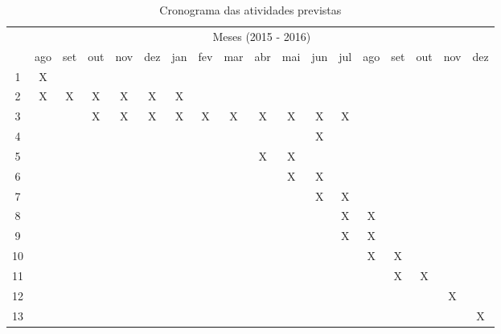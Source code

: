\begin{table}[!htpb]
  \centering
  \begin{small}
    \setlength{\tabcolsep}{4pt}
    \begin{tabular}{|c|c|c|c|c|c|c|c|c|c|c|c|c|c|c|c|c|c|}\hline
     & \multicolumn{17}{c|}{Meses (2015 - 2016)}\\ \cline{2-18}
    \raisebox{1.5ex}{Etapa} & ago & set & out & nov & dez & jan & fev & mar & abr & mai & jun & jul & ago & set & out & nov & dez \\ \hline
    1 & X &   &   &   &   &   &   &   &   &   &   &   &   &   &   &   & \\ \hline
    2 & X & X & X & X & X & X &   &   &   &   &   &   &   &   &   &   & \\ \hline
    3 &   &   & X & X & X & X & X & X & X & X & X & X &   &   &   &   & \\ \hline
    4 &   &   &   &   &   &   &   &   &   &   & X &   &   &   &   &   & \\ \hline
    5 &   &   &   &   &   &   &   &   & X & X &   &   &   &   &   &   & \\ \hline
    6 &   &   &   &   &   &   &   &   &   & X & X &   &   &   &   &   & \\ \hline
    7 &   &   &   &   &   &   &   &   &   &   & X & X &   &   &   &   & \\ \hline
    8 &   &   &   &   &   &   &   &   &   &   &   & X & X &   &   &   & \\ \hline
    9 &   &   &   &   &   &   &   &   &   &   &   & X & X &   &   &   & \\ \hline
    10 &   &   &   &   &   &   &   &   &   &   &   &   & X & X &   &   & \\ \hline
    11 &   &   &   &   &   &   &   &   &   &   &   &   &   & X & X &   & \\ \hline
    12 &   &   &   &   &   &   &   &   &   &   &   &   &   &   &   & X & \\ \hline
    13 &   &   &   &   &   &   &   &   &   &   &   &   &   &   &   &   & X \\ \hline
    \end{tabular}
  \end{small}
  \caption{Cronograma das atividades previstas}
  \label{t_cronograma}
\end{table}


